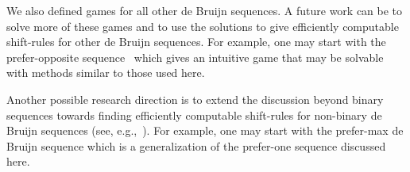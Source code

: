 \documentclass[final,12pt]{elsarticle}
\theoremstyle{definition} \newtheorem{definition}[theorem]{Definition} \newtheorem{observation}[theorem]{Observation} \newtheorem{example}[theorem]{Example} \newtheorem{remark}[theorem]{Remark} \newtheorem{corrolary}[theorem]{Corrolary}
\begin{document}
We also defined games for all other de Bruijn sequences. A future work can be to solve more of these games and to use the solutions to give efficiently computable shift-rules for other de Bruijn sequences. For example, one may start with the prefer-opposite sequence~\cite{alhakim2010simple} which gives an intuitive game that may be solvable with methods similar to those used here.

Another possible research direction is to extend the discussion beyond binary sequences towards finding efficiently computable shift-rules for non-binary de Bruijn sequences (see, e.g.,~\cite{SAWADA2017524}). For example, one may start with the prefer-max de Bruijn sequence which is a generalization of the prefer-one sequence discussed here.  
	
	


\end{document}
